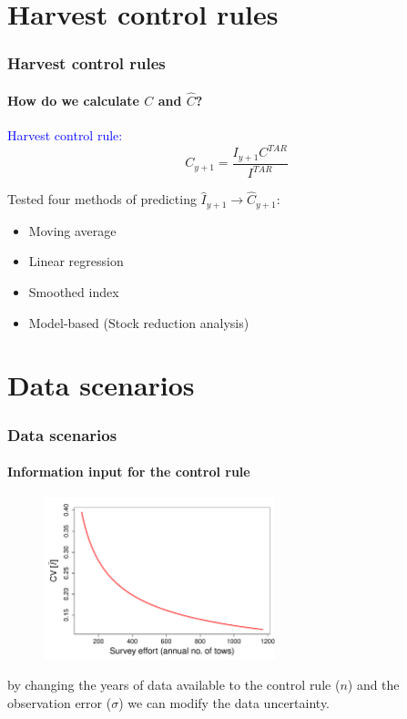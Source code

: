 \documentclass[pdf]{beamer}
\begin{document}
\section{Harvest control rules}
\begin{frame}
\frametitle{Harvest control rules}
\framesubtitle{How do we calculate $C$ and $\hat{C}$?}
\begin{block}{}
\textcolor{blue}{Harvest control rule:}
\vspace{5pt}
\begin{equation}
C_{y+1} = \frac{I_{y+1}C^{TAR}}{I^{TAR}}\nonumber
\end{equation}
\vspace{5pt}
\end{block}
\vspace{20pt}
Tested four methods of predicting $\hat{I}_{y+1}\longrightarrow \hat{C}_{y+1}$:
\begin{itemize}
\item Moving average
\item Linear regression
\item Smoothed index
\item Model-based (Stock reduction analysis)
\end{itemize}
\end{frame}

\section{Data scenarios}
\begin{frame}
\frametitle{Data scenarios}
\framesubtitle{Information input for the control rule}
\begin{figure}
\includegraphics[width=0.6\textwidth]{../dat/obserror.pdf}
\end{figure}
 by changing the \alert{years of data} available to the control rule ($n$) and the \alert{observation error} ($\sigma$) we can modify the data uncertainty.
\end{frame}
\end{document}
